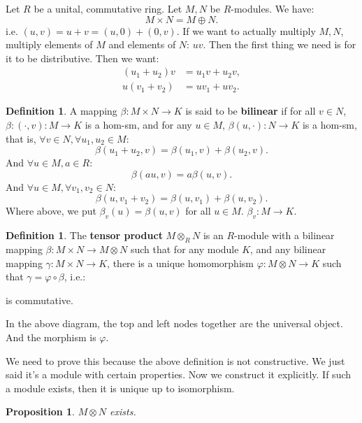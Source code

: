 \documentclass[9pt,reqno,twoside]{amsbook}
\theoremstyle{plain}
\numberwithin{section}{chapter}
\numberwithin{equation}{chapter}
\newtheorem{Prop}[theorem]{Proposition}
\theoremstyle{definition}
\newtheorem{Def}[theorem]{Definition}
\theoremstyle{remark}
\theoremstyle{plain}
\newcommand{\bee}{\begin{equation}\begin{aligned}}
\newcommand{\eee}{\end{aligned}\end{equation}}
\renewcommand{\phi}{\varphi}
\begin{document}
Let $R$ be a unital, commutative ring. Let $M,N$ be $R$-modules. We have:
$$
M \times N = M \oplus N.
$$
i.e. $(u,v) = u + v = (u,0) + (0,v)$. If we want to actually multiply $M,N$, multiply elements of $M$ and elements of $N$: $uv$. Then the first thing we need is for it to be distributive. Then we want:
 \bee
 (u_1 + u_2)v &= u_1v + u_2v,\\
 u(v_1 + v_2) &= uv_1 + uv_2.
 \eee
 \begin{Def}
 A mapping $\beta: M \times N \to K$ is said to be \textbf{bilinear} if for all $v \in N$, $\beta:(\cdot,v):M \to K$ is a hom-sm, and for any $u \in M$, $\beta(u,\cdot):N \to K$ is a hom-sm, that is, $\forall v \in N,\forall u_1,u_2 \in M$:
 $$
 \beta(u_1 + u_2,v) = \beta(u_1,v) + \beta(u_2,v).
 $$
 And $\forall u \in M,a \in R$:
 $$
 \beta(au,v) = a\beta(u,v).
 $$
 And $\forall u \in M,\forall v_1,v_2 \in N$:
 $$
 \beta(u,v_1  + v_2) = \beta(u,v_1) + \beta(u,v_2).
 $$
 Where above, we put $\beta_v(u) = \beta(u,v)$ for all $u \in M$. $\beta_v:M \to K$. 
 \end{Def}
 
 \begin{Def}
 The \textbf{tensor product} $M \otimes_R N$ is an $R$-module with a bilinear mapping $\beta:M \times N \to M \otimes N$ such that for any module $K$, and any bilinear mapping $\gamma:M \times N \to K$, there is a unique homomorphism $\phi: M \otimes N \to K$ such that $\gamma = \phi \circ \beta$, i.e.: 
 
 \begin{center}
\end{center}

is commutative. 
 
 \end{Def}
 
 In the above diagram, the top and left nodes together are the universal object. And the morphism is $\phi$. 
 
  We need to prove this because the above definition is not constructive. We just said it's a module with certain properties. Now we construct it explicitly. If such a module exists, then it is unique up to isomorphism. 
 
 \begin{Prop}
 $M \otimes N$ exists. 
 \end{Prop}
\end{document}
